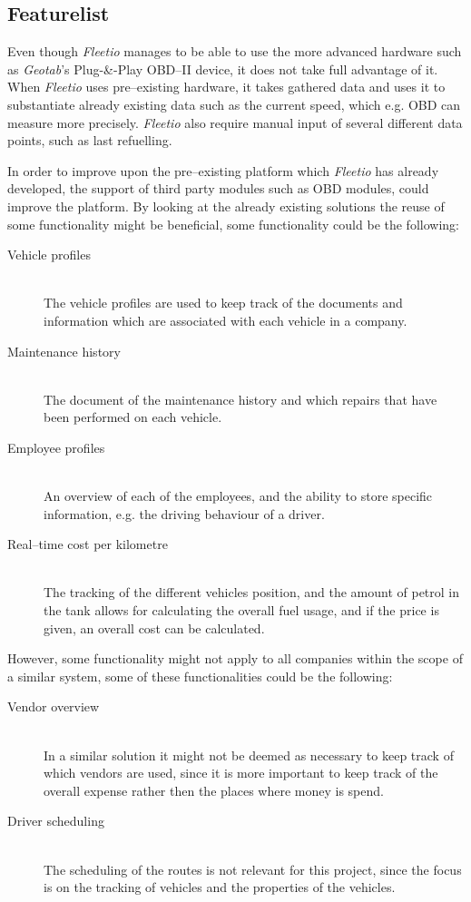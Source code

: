 \subsection{Featurelist}
Even though \textit{Fleetio} manages to be able to use the more advanced hardware such as \textit{Geotab}'s Plug-\&-Play OBD--II device, it does not take full advantage of it.
When \textit{Fleetio} uses pre--existing hardware, it takes gathered data and uses it to substantiate already existing data such as the current speed, which e.g. \ac{OBD} can measure more precisely.
\textit{Fleetio} also require manual input of several different data points, such as last refuelling.

In order to improve upon the pre--existing platform which \textit{Fleetio} has already developed, the support of third party modules such as \ac{OBD} modules, could improve the platform.
By looking at the already existing solutions the reuse of some functionality might be beneficial, some functionality could be the following:
\begin{description}
    \item[Vehicle profiles] \hfill \\
    The vehicle profiles are used to keep track of the documents and information which are associated with each vehicle in a company.
    \item[Maintenance history] \hfill \\
    The document of the maintenance history and which repairs that have been performed on each vehicle.
    \item[Employee profiles] \hfill \\
    An overview of each of the employees, and the ability to store specific information, e.g. the driving behaviour of a driver.
    \item[Real--time cost per kilometre] \hfill \\
    The tracking of the different vehicles position, and the amount of petrol in the tank allows for calculating the overall fuel usage, and if the price is given, an overall cost can be calculated.
\end{description}

However, some functionality might not apply to all companies within the scope of a similar system, some of these functionalities could be the following:
\begin{description}
    \item[Vendor overview] \hfill \\
    In a similar solution it might not be deemed as necessary to keep track of which vendors are used, since it is more important to keep track of the overall expense rather then the places where money is spend.
    \item[Driver scheduling] \hfill \\
    The scheduling of the routes is not relevant for this project, since the focus is on the tracking of vehicles and the properties of the vehicles.
\end{description}


